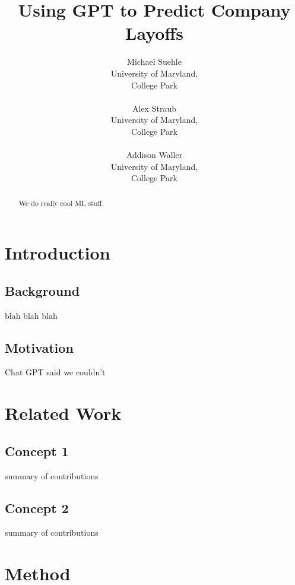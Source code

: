 \documentclass[10pt]{article}
\title{Using GPT to Predict Company Layoffs}
\author{Michael Suehle \\
  University of Maryland, \\
  College Park \\
 \\\And
  Alex Straub \\
  University of Maryland, \\
  College Park \\
  \\\And
  Addison Waller\\
  University of Maryland, \\
  College Park\\}
\begin{document}
\maketitle

\begin{abstract}
  We do really cool ML stuff.
\end{abstract}

%
% 

\section{Introduction}

\subsection{Background}

blah blah blah

\subsection{Motivation}

Chat GPT said we couldn't


%
% 

\section{Related Work}

\subsection{Concept 1}
summary of contributions
\cite{chronos}

\subsection{Concept 2}
summary of contributions


%
% 

\section{Method}
\end{document}
